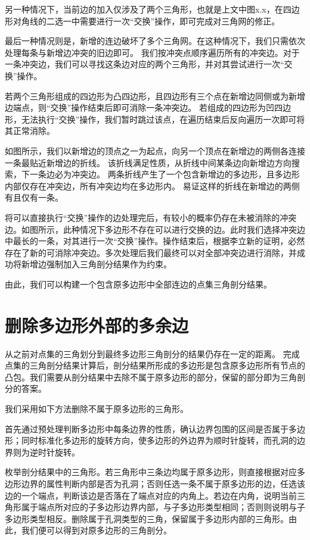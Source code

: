 另一种情况下，当前边的加入仅涉及了两个三角形，也就是上文中图x.x，在四边形对角线的二选一中需要进行一次“交换”操作，即可完成对三角网的修正。

最后一种情况则是，新增的连边破坏了多个三角网。在这种情况下，我们只需依次处理每条与新增边冲突的旧边即可。
我们按冲突点顺序遍历所有的冲突边。对于一条冲突边，我们可以寻找这条边对应的两个三角形，并对其尝试进行一次“交换”操作。

若两个三角形组成的四边形为凸四边形，且四边形有三个点在新增边同侧或为新增边端点，则“交换”操作结束后即可消除一条冲突边。
若组成的四边形为凹四边形，无法执行“交换”操作，我们暂时跳过该点，在遍历结束后反向遍历一次即可将其正常消除。

如图所示，我们以新增边的顶点之一为起点，向另一个顶点在新增边的两侧各连接一条最贴近新增边的折线。
该折线满足性质，从折线中间某条边向新增边方向搜索，下一条边必为冲突边。
两条折线产生了一个包含新增边的多边形，且多边形内部仅存在冲突边，所有冲突边均在多边形内。
易证这样的折线在新增边的两侧有且仅有一条。

将可以直接执行“交换”操作的边处理完后，有较小的概率仍存在未被消除的冲突边。如图所示，此种情况下多边形不存在可以进行交换的边。此时我们选择冲突边中最长的一条，对其进行一次“交换”操作。操作结束后，根据李立新的证明，必然存在了新的可消除冲突边。多次处理后我们最终可以对全部冲突边进行消除，并成功将新增边强制加入三角剖分结果作为约束。

由此，我们可以构建一个包含原多边形中全部连边的点集三角剖分结果。

\section{删除多边形外部的多余边}

从之前对点集的三角划分到最终多边形三角剖分的结果仍存在一定的距离。
完成点集的三角剖分结果计算后，剖分结果所形成的多边形是包含原多边形所有节点的凸包。我们需要从剖分结果中去除不属于原多边形的部分，保留的部分即为三角剖分的答案。

我们采用如下方法删除不属于原多边形的三角形。

首先通过预处理判断多边形中每条边界的性质，确认边界包围的区间是否属于多边形；同时标准化多边形的旋转方向，使多边形的外边界为顺时针旋转，而孔洞的边界则为逆时针旋转。

枚举剖分结果中的三角形。若三角形中三条边均属于原多边形，则直接根据对应多边形边界的属性判断内部是否为孔洞；否则任选一条不属于原多边形的边，任选该边的一个端点，判断该边是否落在了端点对应的内角上。若边在内角，说明当前三角形属于端点所对应的子多边形边界内部，与子多边形类型相同；否则则说明与子多边形类型相反。删除属于孔洞类型的三角，保留属于多边形内部的三角形。由此，我们便可以得到对原多边形的三角剖分。